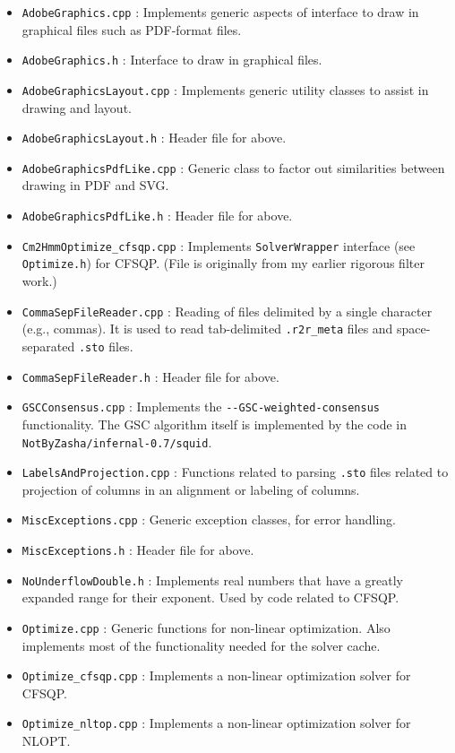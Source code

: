 \documentclass[letterpaper,12pt]{report}
\begin{document}
\begin{itemize}
\item {\tt AdobeGraphics.cpp} : Implements generic aspects of interface to draw in graphical files such as PDF-format files.
\item {\tt AdobeGraphics.h} : Interface to draw in graphical files.
\item {\tt AdobeGraphicsLayout.cpp} : Implements generic utility classes to assist in drawing and layout.
\item {\tt AdobeGraphicsLayout.h} : Header file for above.
\item {\tt AdobeGraphicsPdfLike.cpp} : Generic class to factor out similarities between drawing in PDF and SVG.
\item {\tt AdobeGraphicsPdfLike.h} : Header file for above.
\item {\tt Cm2HmmOptimize\_cfsqp.cpp} : Implements {\tt SolverWrapper} interface (see {\tt Optimize.h}) for CFSQP.  (File is originally from my earlier rigorous filter work.)
\item {\tt CommaSepFileReader.cpp} : Reading of files delimited by a single character (e.g., commas).  It is used to read tab-delimited {\tt .r2r\_meta} files and space-separated {\tt .sto} files.
\item {\tt CommaSepFileReader.h} : Header file for above.
\item {\tt GSCConsensus.cpp} : Implements the {\tt -{}-GSC-weighted-consensus} functionality.  The GSC algorithm itself is implemented by the code in {\tt NotByZasha/infernal-0.7/squid}.
\item {\tt LabelsAndProjection.cpp} : Functions related to parsing {\tt .sto} files related to projection of columns in an alignment or labeling of columns.
\item {\tt MiscExceptions.cpp} : Generic exception classes, for error handling.
\item {\tt MiscExceptions.h} : Header file for above.
\item {\tt NoUnderflowDouble.h} : Implements real numbers that have a greatly expanded range for their exponent.  Used by code related to CFSQP.
\item {\tt Optimize.cpp} : Generic functions for non-linear optimization.
Also implements most of the functionality needed for the solver cache.
\item {\tt Optimize\_cfsqp.cpp} : Implements a non-linear optimization solver for CFSQP.
\item {\tt Optimize\_nltop.cpp} : Implements a non-linear optimization solver for NLOPT.

\end{itemize}
\end{document}
